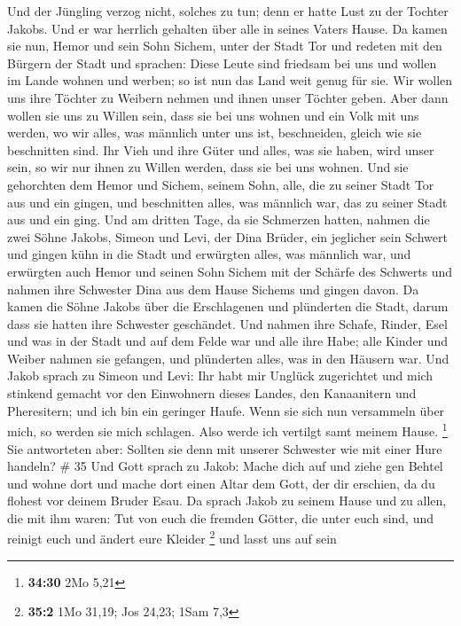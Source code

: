  Und der Jüngling verzog nicht, solches zu tun; denn er
hatte Lust zu der Tochter Jakobs. Und er war herrlich gehalten über alle
in seines Vaters Hause.  Da kamen sie nun, Hemor und sein
Sohn Sichem, unter der Stadt Tor und redeten mit den Bürgern der Stadt
und sprachen:  Diese Leute sind friedsam bei uns und
wollen im Lande wohnen und werben; so ist nun das Land weit genug für
sie. Wir wollen uns ihre Töchter zu Weibern nehmen und ihnen unser
Töchter geben.  Aber dann wollen sie uns zu Willen sein,
dass sie bei uns wohnen und ein Volk mit uns werden, wo wir alles, was
männlich unter uns ist, beschneiden, gleich wie sie beschnitten sind.
 Ihr Vieh und ihre Güter und alles, was sie haben, wird
unser sein, so wir nur ihnen zu Willen werden, dass sie bei uns wohnen.
 Und sie gehorchten dem Hemor und Sichem, seinem Sohn,
alle, die zu seiner Stadt Tor aus und ein gingen, und beschnitten alles,
was männlich war, das zu seiner Stadt aus und ein ging. 
Und am dritten Tage, da sie Schmerzen hatten, nahmen die zwei Söhne
Jakobs, Simeon und Levi, der Dina Brüder, ein jeglicher sein Schwert und
gingen kühn in die Stadt und erwürgten alles, was männlich war,
 und erwürgten auch Hemor und seinen Sohn Sichem mit der
Schärfe des Schwerts und nahmen ihre Schwester Dina aus dem Hause
Sichems und gingen davon.  Da kamen die Söhne Jakobs über
die Erschlagenen und plünderten die Stadt, darum dass sie hatten ihre
Schwester geschändet.  Und nahmen ihre Schafe, Rinder,
Esel und was in der Stadt und auf dem Felde war  und alle
ihre Habe; alle Kinder und Weiber nahmen sie gefangen, und plünderten
alles, was in den Häusern war.  Und Jakob sprach zu
Simeon und Levi: Ihr habt mir Unglück zugerichtet und mich stinkend
gemacht vor den Einwohnern dieses Landes, den Kanaanitern und
Pheresitern; und ich bin ein geringer Haufe. Wenn sie sich nun
versammeln über mich, so werden sie mich schlagen. Also werde ich
vertilgt samt meinem Hause. \footnote{\textbf{34:30} 2Mo 5,21}
 Sie antworteten aber: Sollten sie denn mit unserer
Schwester wie mit einer Hure handeln? \# 35  Und Gott
sprach zu Jakob: Mache dich auf und ziehe gen Behtel und wohne dort und
mache dort einen Altar dem Gott, der dir erschien, da du flohest vor
deinem Bruder Esau.  Da sprach Jakob zu seinem Hause und
zu allen, die mit ihm waren: Tut von euch die fremden Götter, die unter
euch sind, und reinigt euch und ändert eure Kleider \footnote{\textbf{35:2}
  1Mo 31,19; Jos 24,23; 1Sam 7,3}  und lasst uns auf sein

